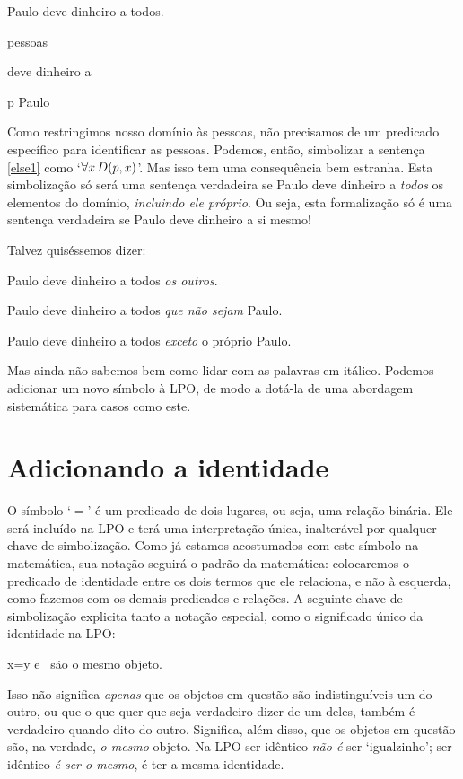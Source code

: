 \begin{earg}
\item[\ex{else1}] Paulo deve dinheiro a todos.
\end{earg}
	\begin{center}
	\begin{ekey}
		\item[\text{domínio}] pessoas
		\item[\atom{D}{x,y}]  deve dinheiro a 
		\item[p] Paulo
	\end{ekey}
	\end{center}
Como restringimos nosso domínio às pessoas, não precisamos de um predicado específico para identificar as pessoas.
Podemos, então, simbolizar a sentença \ref{else1} como `$\forall x\, \mathord{D}(p,x)$'.
Mas isso tem uma consequência bem estranha.
Esta simbolização só será uma sentença verdadeira se Paulo deve dinheiro a \emph{todos} os elementos do domínio, \emph{incluindo ele próprio}.
Ou seja, esta formalização só é uma sentença verdadeira se Paulo deve dinheiro a si mesmo!

Talvez quiséssemos dizer:
	\begin{earg}
		\item[\ex{else1b}] Paulo deve dinheiro a todos \emph{os outros}.
		\item[\ex{else1c}] Paulo deve dinheiro a todos \emph{que não sejam} Paulo.
		\item[\ex{else1d}] Paulo deve dinheiro a todos  \emph{exceto} o próprio Paulo.
	\end{earg}
Mas ainda não sabemos bem como lidar com as palavras em itálico.
Podemos adicionar um novo símbolo à LPO, de modo a dotá-la de uma abordagem sistemática para casos como este.


\section{Adicionando a identidade}
O símbolo `$=$' é um predicado de dois lugares, ou seja, uma relação binária.
Ele será incluído na LPO e terá uma interpretação única, inalterável por qualquer chave de simbolização.
Como já estamos acostumados com este símbolo na matemática, sua notação seguirá o padrão da matemática:
colocaremos o predicado de identidade entre os dois termos que ele relaciona, e não à esquerda, como fazemos com os demais predicados e relações.
A seguinte chave de simbolização explicita tanto a notação especial, como o significado único da identidade na LPO:
	\begin{ekey}
		\item[x=y]  e \ são o mesmo objeto. 
	\end{ekey}
Isso não significa \emph{apenas} que os objetos em questão são indistinguíveis um do outro, ou que o que quer que seja verdadeiro dizer de um deles, também é verdadeiro quando dito do outro.
Significa, além disso, que os objetos em questão são, na verdade, \emph{o mesmo} objeto.
Na LPO ser idêntico \emph{não é} ser `igualzinho'; ser idêntico \emph{é ser o mesmo}, é ter a mesma identidade.

